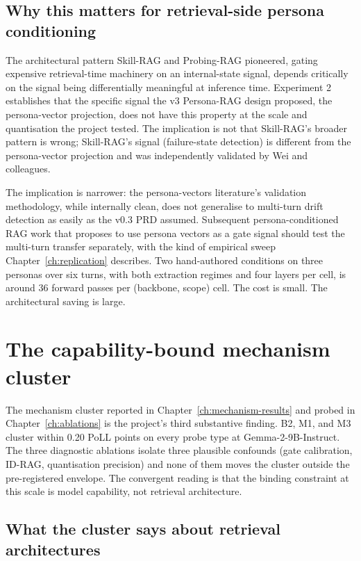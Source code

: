 \subsection{Why this matters for retrieval-side persona conditioning}

The architectural pattern Skill-RAG\autocite{wei2026skillrag} and Probing-RAG\autocite{baek2025probingrag} pioneered, gating expensive retrieval-time machinery on an internal-state signal, depends critically on the signal being differentially meaningful at inference time. Experiment 2 establishes that the specific signal the v3 Persona-RAG design proposed, the persona-vector projection, does not have this property at the scale and quantisation the project tested. The implication is not that Skill-RAG's broader pattern is wrong; Skill-RAG's signal (failure-state detection) is different from the persona-vector projection and was independently validated by Wei and colleagues.

The implication is narrower: the persona-vectors literature's validation methodology, while internally clean, does not generalise to multi-turn drift detection as easily as the v0.3 PRD assumed. Subsequent persona-conditioned RAG work that proposes to use persona vectors as a gate signal should test the multi-turn transfer separately, with the kind of empirical sweep Chapter~\ref{ch:replication} describes. Two hand-authored conditions on three personas over six turns, with both extraction regimes and four layers per cell, is around 36 forward passes per (backbone, scope) cell. The cost is small. The architectural saving is large.

\section{The capability-bound mechanism cluster}

The mechanism cluster reported in Chapter~\ref{ch:mechanism-results} and probed in Chapter~\ref{ch:ablations} is the project's third substantive finding. B2, M1, and M3 cluster within 0.20 PoLL points on every probe type at Gemma-2-9B-Instruct. The three diagnostic ablations isolate three plausible confounds (gate calibration, ID-RAG, quantisation precision) and none of them moves the cluster outside the pre-registered envelope. The convergent reading is that the binding constraint at this scale is model capability, not retrieval architecture.

\subsection{What the cluster says about retrieval architectures}

